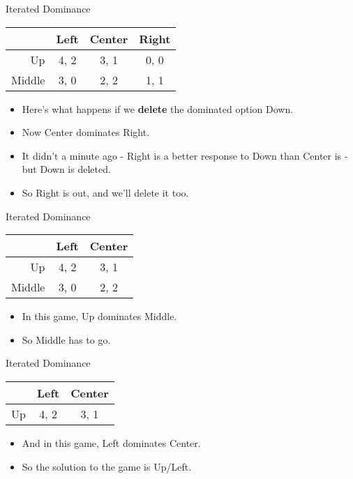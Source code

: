 \documentclass[
  ignorenonframetext,
]{beamer}
\providecommand{\tightlist}{%
  \setlength{\itemsep}{0pt}\setlength{\parskip}{0pt}}
\begin{document}
\begin{frame}{Iterated Dominance}
\protect\hypertarget{iterated-dominance-2}{}
\begin{table}[!h]
\centering
\begin{tabular}[t]{>{}r|ccc}
\toprule
 & Left & Center & Right\\
\midrule
Up & 4, 2 & 3, 1 & 0, 0\\
Middle & 3, 0 & 2, 2 & 1, 1\\
\bottomrule
\end{tabular}
\end{table}

\begin{itemize}
\tightlist
\item
  Here's what happens if we \textbf{delete} the dominated option Down.
\item
  Now Center dominates Right.
\item
  It didn't a minute ago - Right is a better response to Down than
  Center is - but Down is deleted.
\item
  So Right is out, and we'll delete it too.
\end{itemize}
\end{frame}

\begin{frame}{Iterated Dominance}
\protect\hypertarget{iterated-dominance-3}{}
\begin{table}[!h]
\centering
\begin{tabular}[t]{>{}r|cc}
\toprule
 & Left & Center\\
\midrule
Up & 4, 2 & 3, 1\\
Middle & 3, 0 & 2, 2\\
\bottomrule
\end{tabular}
\end{table}

\begin{itemize}
\tightlist
\item
  In this game, Up dominates Middle.
\item
  So Middle has to go.
\end{itemize}
\end{frame}

\begin{frame}{Iterated Dominance}
\protect\hypertarget{iterated-dominance-4}{}
\begin{table}[!h]
\centering
\begin{tabular}[t]{>{}r|cc}
\toprule
 & Left & Center\\
\midrule
Up & 4, 2 & 3, 1\\
\bottomrule
\end{tabular}
\end{table}

\begin{itemize}
\tightlist
\item
  And in this game, Left dominates Center.
\item
  So the solution to the game is Up/Left.
\end{itemize}
\end{frame}
\end{document}
